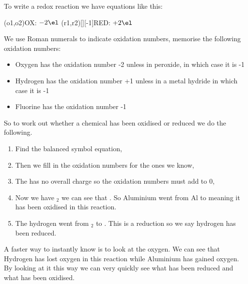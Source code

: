 	To write a redox reaction we have equations like this:
	\begin{center}
	\vspace{7mm}
	\redox(o1,o2){\small OX: $- 2\el$}
	\redox(r1,r2)[][-1]{\small RED: $+ 2\el$}
	\vspace{7mm}
	\end{center}
	We use Roman numerals to indicate oxidation numbers, memorise the following oxidation numbers:
	\begin{itemize}
		\item Oxygen has the oxidation number -2 unless in peroxide, in which case it is -1
		\item Hydrogen has the oxidation number +1 unless in a metal hydride in which case it is -1
		\item Fluorine has the oxidation number -1
	\end{itemize}
	So to work out whether a chemical has been oxidised or reduced we do the following.
	
	\begin{enumerate}
		\item Find the balanced symbol equation,
		
		
		\item Then we fill in the oxidation numbers for the ones we know,
		
		 
		\item The  has no overall charge so the oxidation numbers must add to 0,
		
		
		\item Now we have $_2$ we can see that . So Aluminium went from Al to  meaning it has been oxidised in this reaction.
		
		\item The hydrogen went from $_2$ to . This is a reduction so we say hydrogen has been reduced.
	\end{enumerate}
	
	A faster way to instantly know is to look at the oxygen.
	We can see that Hydrogen has lost oxygen in this reaction while Aluminium has gained oxygen.
	By looking at it this way we can very quickly see what has been reduced and what has been oxidised.
	
